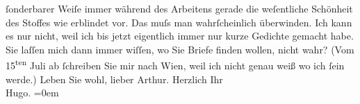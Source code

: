 \begin{ledgroupsized}[t]{13cm}
                    ſonderbarer Weiſe immer während des Arbeitens gerade die weſentliche Schönheit
                    des Stoffes wie erblindet vor. Das muſs man wahrſcheinlich überwinden. Ich kann
                    es nur nicht, weil ich bis jetzt eigentlich immer nur {\pb}kurze Gedichte gemacht
                    habe.\pend
           \pstart
           Sie laſſen mich dann immer wiſſen, wo Sie Briefe finden wollen, nicht wahr? (Vom
                            15\textsuperscript{ten} Juli ab ſchreiben Sie mir
                    nach Wien, weil ich nicht genau weiß wo ich
                    ſein werde.) Leben Sie wohl, lieber Arthur.\pend
           \pstart
           Herzlich Ihr{\\[\baselineskip]}\spacefill\mbox{Hugo.}\pend
           \leftskip=0em{}\endnumbering{}\end{ledgroupsized}  \newcommand{\dateiname}{L00556}\newcommand{\titel}{Hugo von Hofmannsthal an Arthur Schnitzler, 27. 6. [1896]}\newcommand{\editorInnen}{Martin Anton Müller und Gerd-Hermann Susen}
      